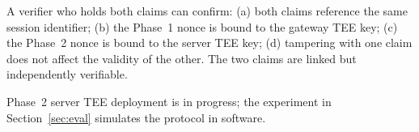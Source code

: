 A verifier who holds both claims can confirm: (a) both claims reference the same session
identifier; (b) the Phase~1 nonce is bound to the gateway TEE key; (c) the Phase~2 nonce
is bound to the server TEE key; (d) tampering with one claim does not affect the validity
of the other. The two claims are linked but independently verifiable.

Phase~2 server TEE deployment is in progress; the experiment in Section~\ref{sec:eval}
simulates the protocol in software.
